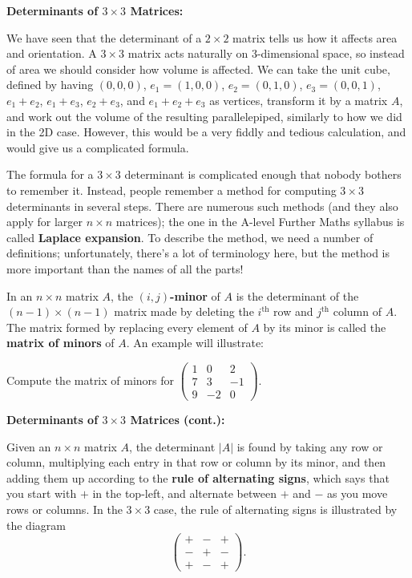 \documentclass{article}
\begin{document}
\clearpage



\textbf{Determinants of $3\times 3$ Matrices:}\bigskip

We have seen that the determinant of a $2\times 2$ matrix tells us how it affects area and orientation. A $3\times 3$ matrix acts naturally on 3-dimensional space, so instead of area we should consider how volume is affected. We can take the unit cube, defined by having $(0,0,0)$, $e_1=(1,0,0)$, $e_2=(0,1,0)$, $e_3=(0,0,1)$, $e_1+e_2$, $e_1+e_3$, $e_2+e_3$, and $e_1+e_2+e_3$ as vertices, transform it by a matrix $A$, and work out the volume of the resulting parallelepiped, similarly to how we did in the 2D case. However, this would be a very fiddly and tedious calculation, and would give us a complicated formula.

The formula for a $3\times 3$ determinant is complicated enough that nobody bothers to remember it. Instead, people remember a method for computing $3\times 3$ determinants in several steps. There are numerous such methods (and they also apply for larger $n\times n$ matrices); the one in the A-level Further Maths syllabus is called \textbf{Laplace expansion}. To describe the method, we need a number of definitions; unfortunately, there's a lot of terminology here, but the method is more important than the names of all the parts!\medskip


In an $n\times n$ matrix $A$, the $(i,j)$\textbf{-minor} of $A$ is the determinant of the $(n-1)\times(n-1)$ matrix made by deleting the $i^\mathrm{th}$ row and $j^\mathrm{th}$ column of $A$. The matrix formed by replacing every element of $A$ by its minor is called the \textbf{matrix of minors} of $A$. An example will illustrate:\medskip

Compute the matrix of minors for $\left(\begin{array}{ccc}1&0&2\\7&3&-1\\9&-2&0\end{array}\right)$.



\clearpage



\textbf{Determinants of $3\times 3$ Matrices (cont.):}\bigskip


Given an $n\times n$ matrix $A$, the determinant $|A|$ is found by taking any row or column, multiplying each entry in that row or column by its minor, and then adding them up according to the \textbf{rule of alternating signs}, which says that you start with $+$ in the top-left, and alternate between $+$ and $-$ as you move rows or columns. In the $3\times 3$ case, the rule of alternating signs is illustrated by the diagram
\[\left(\begin{array}{ccc}+&-&+\\-&+&-\\+&-&+\end{array}\right).\]
\end{document}
